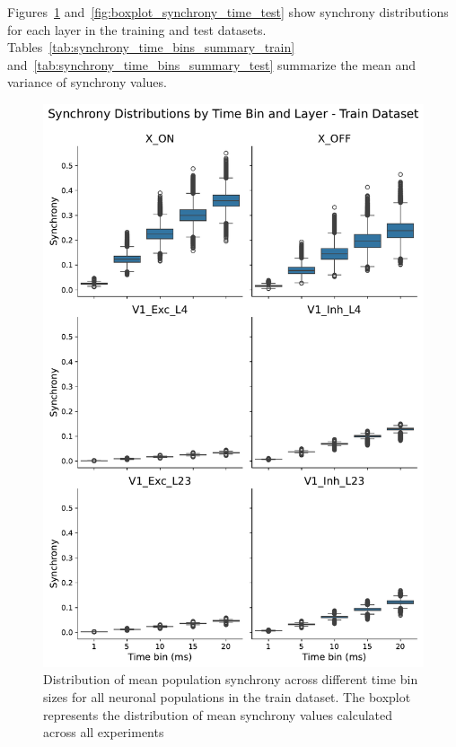 Figures~\ref{fig:boxplot_synchrony_time_train} and~\ref{fig:boxplot_synchrony_time_test} show synchrony distributions for each layer in the training and test datasets. Tables~\ref{tab:synchrony_time_bins_summary_train} and~\ref{tab:synchrony_time_bins_summary_test} summarize the mean and variance of synchrony values.

\begin{figure}
    \centering
    \includegraphics[width=0.92\linewidth]{img/plots/synchrony_boxplot_time_bins_train.pdf}
    \caption{Distribution of mean population synchrony across different time bin sizes for all neuronal populations in the train dataset. The boxplot represents the distribution of mean synchrony values calculated across all experiments}
    \label{fig:boxplot_synchrony_time_train}
\end{figure}


